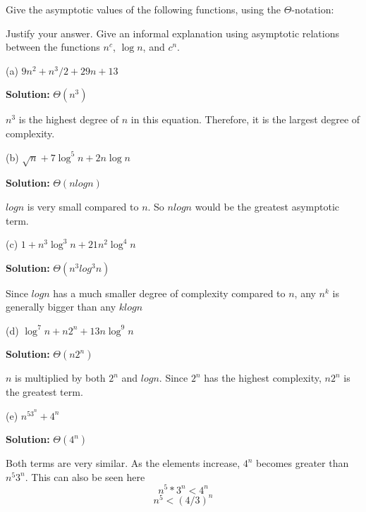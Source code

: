 
\begin{problem}
Give the asymptotic values of the
following functions, using the $\Theta$-notation:

Justify your answer.
Give an informal explanation using asymptotic
relations between the functions $n^c$, $\log n$, and $c^n$.

\medskip
(a) $9n^2 + n^3/2 + 29n + 13$

\medskip
\textbf{Solution:} $\Theta (n^3)$

$n^3$ is the highest degree of $n$ in this equation. Therefore, it is the largest degree of complexity.

\medskip
(b) $\sqrt{n}+ 7\log^5 n + 2n\log n$

\medskip
\textbf{Solution:} $\Theta (nlogn)$

$logn$ is very small compared to $n$. So $nlogn$ would be the greatest asymptotic term.
\medskip

(c) $1+ n^3\log^3n + 21 n^2\log^4n$

\medskip
\textbf{Solution:} $\Theta (n^3log^3n)$

Since $logn$ has a much smaller degree of complexity compared to $n$, any $n^k$ is generally bigger than any $klogn$
\medskip


(d) $\log^7n + n 2^n + 13n\log^9n$

\medskip
\textbf{Solution:} $\Theta (n2^n)$

$n$ is multiplied by both $2^n$ and $logn$. Since $2^n$ has the highest complexity, $n2^n$ is the greatest term.
\medskip

(e) {$n^53^n+4^n$}

\medskip
\textbf{Solution:} $\Theta (4^n)$

Both terms are very similar. As the elements increase, $4^n$ becomes greater than $n^5 3^n$. This can also be seen here
\[ n^5 * 3^n  <  4^n \]
\[ n^5 < (4/3)^n \]

\end{problem}


